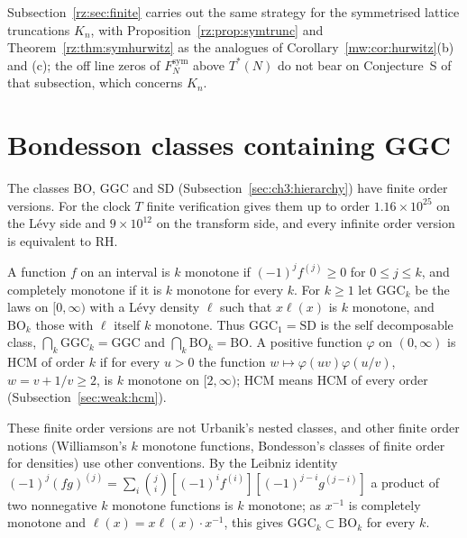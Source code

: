 Subsection~\ref{rz:sec:finite} carries out the same strategy for the symmetrised lattice truncations $K_n$, with Proposition~\ref{rz:prop:symtrunc} and Theorem~\ref{rz:thm:symhurwitz} as the analogues of Corollary~\ref{mw:cor:hurwitz}(b) and (c); the off line zeros of $F_N^{\mathrm{sym}}$ above $T^*(N)$ do not bear on Conjecture~S of that subsection, which concerns $K_n$.

\section{Bondesson classes containing GGC}\label{mw:sec:bondesson}

The classes BO, GGC and SD (Subsection~\ref{sec:ch3:hierarchy}) have finite order versions. For the clock $T$ finite verification gives them up to order $1.16\times10^{25}$ on the L\'evy side and $9\times10^{12}$ on the transform side, and every infinite order version is equivalent to RH.

\begin{definition}\label{mw:def:orders}
A function $f$ on an interval is $k$ monotone if $(-1)^jf^{(j)}\geq0$ for $0\leq j\leq k$, and completely monotone if it is $k$ monotone for every $k$. For $k\geq1$ let $\mathrm{GGC}_k$ be the laws on $[0,\infty)$ with a L\'evy density $\ell$ such that $x\ell(x)$ is $k$ monotone, and $\mathrm{BO}_k$ those with $\ell$ itself $k$ monotone. Thus $\mathrm{GGC}_1=\mathrm{SD}$ is the self decomposable class, $\bigcap_k\mathrm{GGC}_k=\mathrm{GGC}$ and $\bigcap_k\mathrm{BO}_k=\mathrm{BO}$. A positive function $\varphi$ on $(0,\infty)$ is HCM of order $k$ if for every $u>0$ the function $w\mapsto\varphi(uv)\varphi(u/v)$, $w=v+1/v\geq2$, is $k$ monotone on $[2,\infty)$; HCM means HCM of every order (Subsection~\ref{sec:weak:hcm}).
\end{definition}

These finite order versions are not Urbanik's nested classes, and other finite order notions (Williamson's $k$ monotone functions, Bondesson's classes of finite order for densities) use other conventions. By the Leibniz identity $(-1)^j(fg)^{(j)}=\sum_i\binom ji[(-1)^if^{(i)}][(-1)^{j-i}g^{(j-i)}]$ a product of two nonnegative $k$ monotone functions is $k$ monotone; as $x^{-1}$ is completely monotone and $\ell(x)=x\ell(x)\cdot x^{-1}$, this gives $\mathrm{GGC}_k\subset\mathrm{BO}_k$ for every $k$.

